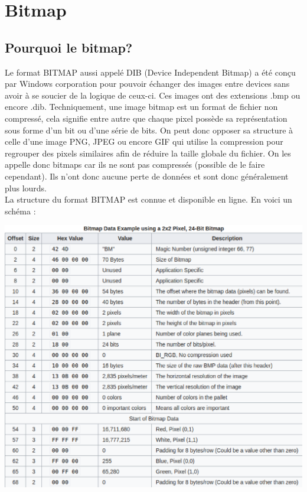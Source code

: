 \section{Bitmap}

\subsection{Pourquoi le bitmap?}
Le format BITMAP aussi appelé DIB (Device Independent Bitmap) a été conçu par Windows corporation pour pouvoir échanger des images entre devices sans avoir à se soucier de la logique de ceux-ci.
Ces images ont des extensions .bmp ou encore .dib.
Techniquement, une image bitmap est un format de fichier non compressé, cela signifie entre autre que chaque pixel possède sa représentation sous forme d'un bit ou d'une série de bits.
On peut donc opposer sa structure à celle d'une image PNG, JPEG ou encore GIF qui utilise la compression pour regrouper des pixels similaires afin de réduire la taille globale du fichier.
On les appelle donc bitmaps car ils ne sont pas compressés (possible de le faire cependant).
Ils n'ont donc aucune perte de données et sont donc généralement plus lourds.\\
La structure du format BITMAP est connue et disponible en ligne. En voici un schéma :

\vspace{1.5cm}

\includegraphics[width=15cm]{bitmap_structure.eps}\\\\

